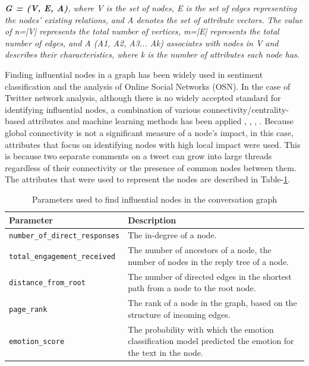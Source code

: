 \documentclass[acmtog]{acmart}
\begin{document}
\textit{\textbf{G = (V, E, A)}, where V is the set of nodes, E is the set of edges representing the nodes' existing relations, and A denotes the set of attribute vectors. The value of n=|V| represents the total number of vertices, m=|E| represents the total number of edges, and A (A1, A2, A3... Ak) associates with nodes in V and describes their characteristics, where k is the number of attributes each node has.}


Finding influential nodes in a graph has been widely used in sentiment classification and the analysis of Online Social Networks (OSN). In the case of Twitter network analysis, although there is no widely accepted standard for identifying influential nodes, a combination of various connectivity/centrality-based attributes and machine learning methods has been applied \cite{berahmand2020new}, \cite{vilarinho2018global}, \cite{ban2021lexical}, \cite{bordoloi2020graph}. Because global connectivity is not a significant measure of a node's impact, in this case, attributes that focus on identifying nodes with high local impact were used. This is because two separate comments on a tweet can grow into large threads regardless of their connectivity or the presence of common nodes between them. The attributes that were used to represent the nodes are described in Table-\ref{tab:params_rule}.

\begin{table}[]
\centering
\caption{Parameters used to find influential nodes in the conversation graph}
\label{tab:params_rule}
\begin{tabular}{|p{4cm}|p{4.2cm}|}
\hline
Parameter                                         & Description                                                                                                                          \\ \hline
\texttt{number\_of\_direct\_responses}              & The in-degree of a node.                                                             \\
\texttt{total\_engagement\_received}        & The number of ancestors of a node, the number of nodes in the reply tree of a node.                                                             \\
\texttt{distance\_from\_root}             & The number of directed edges in the shortest path from a node to the root node.                                                                   \\
\texttt{page\_rank}                      & The rank of a node in the graph, based on the structure of incoming edges.                                                                      \\
\texttt{emotion\_score}                 & The probability with which the emotion classification model predicted the emotion for the text in the node.                              
                                                                         \\ \hline
\end{tabular}
\end{table}
\end{document}
